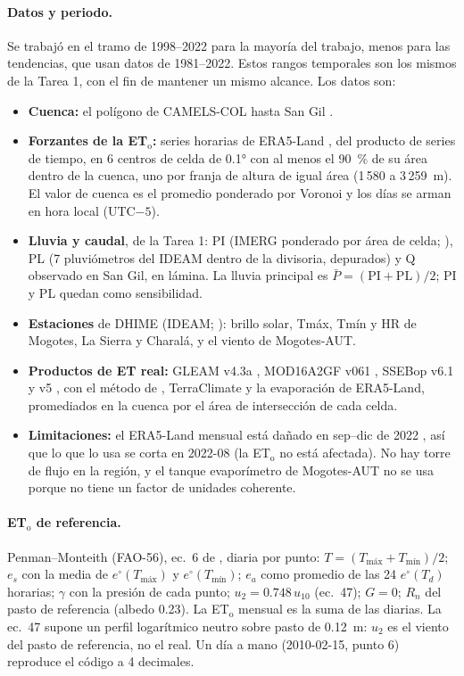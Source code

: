 \documentclass[11pt,letterpaper]{article}
\newcommand{\ETo}{ET$_\mathrm{o}$}
\newcommand{\PM}{Penman--Monteith (FAO-56)}
\begin{document}
\paragraph{Datos y periodo.} Se trabajó en el tramo de 1998--2022 para la mayoría del trabajo, menos para las
tendencias, que usan datos de 1981--2022. Estos rangos temporales son los mismos de la Tarea 1, con el fin de mantener
un mismo alcance. Los datos son:
\begin{itemize}
  \item \textbf{Cuenca:} el polígono de CAMELS-COL hasta San Gil \citep{camelscol}.
  \item \textbf{Forzantes de la \ETo:} series horarias de ERA5-Land \citep{munoz2021}, del producto de series de
  tiempo, en 6 centros de celda de 0.1° con al menos el 90~\% de su área dentro de la cuenca, uno por franja de altura
  de igual área (1\,580 a 3\,259~m). El valor de cuenca es el promedio ponderado por Voronoi y los días se arman en hora
  local (UTC$-5$).
  \item \textbf{Lluvia y caudal}, de la Tarea 1: PI (IMERG ponderado por área de celda; \citealp{huffman_imerg}), PL
  (7 pluviómetros del IDEAM dentro de la divisoria, depurados) y Q observado en San Gil, en lámina. La lluvia principal
  es $\bar{P} = (\mathrm{PI}+\mathrm{PL})/2$; PI y PL quedan como sensibilidad.
  \item \textbf{Estaciones} de DHIME (IDEAM; \citealp{ideam_dhime}): brillo solar, Tmáx, Tmín y HR de Mogotes,
  La Sierra y Charalá, y el viento de Mogotes-AUT.
  \item \textbf{Productos de ET real:} GLEAM v4.3a \citep{miralles2025}, MOD16A2GF v061 \citep{running2021}, SSEBop
  v6.1 y v5 \citep{senay2023datos,senay2017datos}, con el método de \citet{senay2013}, TerraClimate
  \citep{abatzoglou2018} y la evaporación de ERA5-Land, promediados en la cuenca por el área de intersección de cada
  celda.
  \item \textbf{Limitaciones:} el ERA5-Land mensual está dañado en sep--dic de 2022 \citep{ecmwf2024}, así que lo que
  lo usa se corta en 2022-08 (la \ETo{} no está afectada). No hay torre de flujo en la región, y el tanque
  evaporímetro de Mogotes-AUT no se usa porque no tiene un factor de unidades coherente.
\end{itemize}

\paragraph{\ETo{} de referencia.} \PM{}, ec.~6 de \citet{allen1998}, diaria por punto: $T = (T_\text{máx} +
T_\text{mín})/2$; $e_s$ con la media de $e^\circ(T_\text{máx})$ y $e^\circ(T_\text{mín})$; $e_a$ como promedio de
las 24 $e^\circ(T_d)$ horarias; $\gamma$ con la presión de cada punto; $u_2 = 0.748\,u_{10}$ (ec.~47); $G = 0$; $R_n$
del pasto de referencia (albedo 0.23). La \ETo{} mensual es la suma de las diarias. La ec.~47 supone un perfil
logarítmico neutro sobre pasto de 0.12~m: $u_2$ es el viento del pasto de referencia, no el real. Un día a mano
(2010-02-15, punto 6) reproduce el código a 4 decimales.
\end{document}
